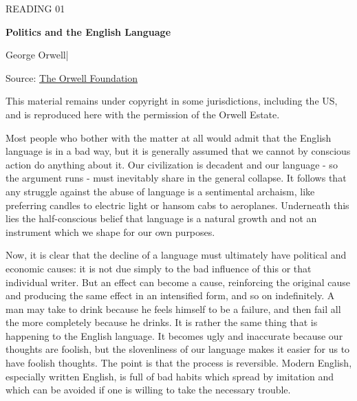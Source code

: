\begingroup

\thispagestyle{fancy}
\label{article-01}
\begingroup\raggedright
\setlength{\parindent}{0pt}
{\fontsize{9}{12}\selectfont\color{headgrey}READING 01\par}
\vspace{4pt}
{\fontsize{24}{30}\selectfont\bfseries Politics and the English Language\par}
\vspace{7pt}
{\fontsize{12}{18}\selectfont George Orwell\quad|\par}
\vspace{4pt}
{\fontsize{9}{12.5}\selectfont\color{headgrey}Source: \href{https://www.orwellfoundation.com/the-orwell-foundation/orwell/essays-and-other-works/politics-and-the-english-language/}{The Orwell Foundation}\par}
\vspace{2pt}
{\fontsize{8.5}{11.5}\selectfont\color{headgrey}This material remains under copyright in some jurisdictions, including the US, and is reproduced here with the permission of the Orwell Estate.\par}
\endgroup
\vspace{6pt}

Most people who bother with the matter at all would admit that the English language is in a bad way, but it is generally assumed that we cannot by conscious action do anything about it. Our civilization is decadent and our language - so the argument runs - must inevitably share in the general collapse. It follows that any struggle against the abuse of language is a sentimental archaism, like preferring candles to electric light or hansom cabs to aeroplanes. Underneath this lies the half-conscious belief that language is a natural growth and not an instrument which we shape for our own purposes.\par

Now, it is clear that the decline of a language must ultimately have political and economic causes: it is not due simply to the bad influence of this or that individual writer. But an effect can become a cause, reinforcing the original cause and producing the same effect in an intensified form, and so on indefinitely. A man may take to drink because he feels himself to be a failure, and then fail all the more completely because he drinks. It is rather the same thing that is happening to the English language. It becomes ugly and inaccurate because our thoughts are foolish, but the slovenliness of our language makes it easier for us to have foolish thoughts. The point is that the process is reversible. Modern English, especially written English, is full of bad habits which spread by imitation and which can be avoided if one is willing to take the necessary trouble.\par

